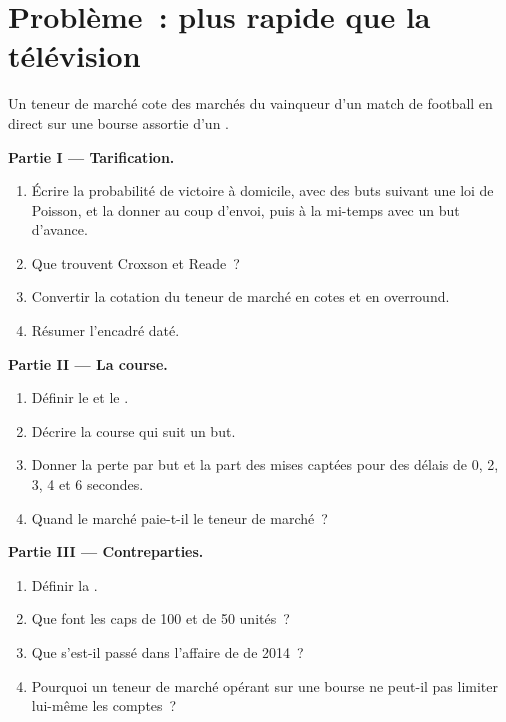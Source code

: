 \section{Problème~: plus rapide que la télévision}

\begin{problem}\label{pb:hf:prediction-and-sports-market-making:1}
Un teneur de marché cote des marchés du vainqueur d'un match de football en direct sur une bourse assortie d'un .

\medskip\noindent\textbf{Partie I --- Tarification.}
\begin{enumerate}
\item Écrire la probabilité de victoire à domicile, avec des buts suivant une loi de Poisson, et la donner au coup d'envoi, puis à la mi-temps avec un but d'avance.
\item Que trouvent Croxson et Reade~?
\item Convertir la cotation du teneur de marché en cotes et en overround.
\item Résumer l'encadré daté.
\end{enumerate}

\medskip\noindent\textbf{Partie II --- La course.}
\begin{enumerate}[resume]
\item Définir le  et le .
\item Décrire la course qui suit un but.
\item Donner la perte par but et la part des mises captées pour des délais de 0, 2, 3, 4 et 6 secondes.
\item Quand le marché paie-t-il le teneur de marché~?
\end{enumerate}

\medskip\noindent\textbf{Partie III --- Contreparties.}
\begin{enumerate}[resume]
\item Définir la .
\item Que font les caps de 100 et de 50 unités~?
\item Que s'est-il passé dans l'affaire de  de 2014~?
\item Pourquoi un teneur de marché opérant sur une bourse ne peut-il pas limiter lui-même les comptes~?
\end{enumerate}


\end{problem}
